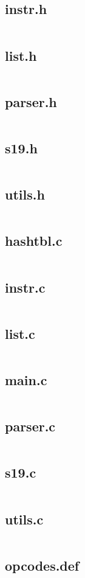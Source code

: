 \documentclass[a4paper,11pt]{article}
\begin{document}
        \subsection{instr.h}
            \inputminted[linenos]{c}{../../src/instr.h}
        \subsection{list.h}
            \inputminted[linenos]{c}{../../src/list.h}
        \subsection{parser.h}
            \inputminted[linenos]{c}{../../src/parser.h}
        \subsection{s19.h}
            \inputminted[linenos]{c}{../../src/s19.h}
        \subsection{utils.h}
            \inputminted[linenos]{c}{../../src/utils.h}
        \subsection{hashtbl.c}
            \inputminted[linenos]{c}{../../src/hashtbl.c}
        \subsection{instr.c}
            \inputminted[linenos]{c}{../../src/instr.c}
        \subsection{list.c}
            \inputminted[linenos]{c}{../../src/list.c}
        \subsection{main.c}
            \inputminted[linenos]{c}{../../src/main.c}
        \subsection{parser.c}
            \inputminted[linenos]{c}{../../src/parser.c}
        \subsection{s19.c}
            \inputminted[linenos]{c}{../../src/s19.c}
        \subsection{utils.c}
            \inputminted[linenos]{c}{../../src/utils.c}
        \subsection{opcodes.def}
            \inputminted[linenos]{c}{../../src/opcodes.def}
\end{document}
